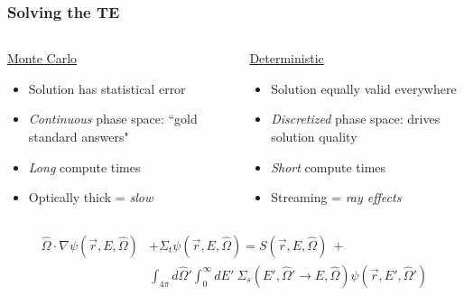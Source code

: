 \documentclass[xcolor=x11names,compress, handout]{beamer}
\renewcommand{\(}{\begin{columns}}
\renewcommand{\)}{\end{columns}}
\newcommand{\<}[1]{\begin{column}{#1}}
\renewcommand{\>}{\end{column}}
\newcommand{\vOmega}{\ensuremath{\hat{\Omega}}}
\begin{document}
\begin{frame}[fragile]
  \frametitle{Solving the TE}
%
\begin{columns}
  \begin{column}{0.5\textwidth}
  \begin{center}
  \underline{Monte Carlo}
  \end{center}
	\begin{itemize}
	\item Solution has statistical error
	\item \textit{Continuous} phase space: ``gold standard answers"
	\item\textit{ Long }compute times
	\item Optically thick = \textit{slow}
	\end{itemize}
  \end{column}
  \begin{column}{0.5\textwidth}
  \begin{center}
  \underline{Deterministic}
  \end{center}
	\begin{itemize}
	\item Solution equally valid everywhere
	\item \textit{Discretized} phase space: drives solution quality
	\item \textit{Short} compute times
	\item Streaming = \textit{ray effects}
	\end{itemize}
  \end{column}
\end{columns}

\begin{align}
\vOmega \cdot \nabla \psi(\vec{r}, E, \vOmega) &+
\Sigma_t \psi(\vec{r}, E, \vOmega) = S(\vec{r}, E, \vOmega) \:+\nonumber\\
%
& \int_{4\pi} d\vOmega' \int_0^{\infty} dE'\: \Sigma_s(E', \vOmega' \rightarrow E, \vOmega) \psi(\vec{r}, E', \vOmega') \nonumber
\end{align}

\end{frame}
\end{document}
